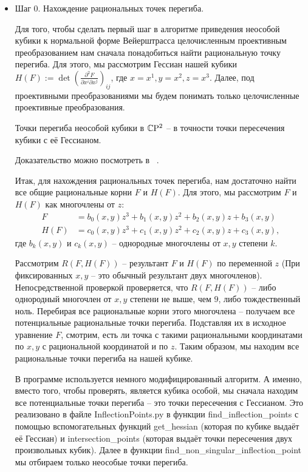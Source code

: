 \begin{itemize}[leftmargin=0.6cm]
    
    \item Шаг 0. Нахождение рациональных точек перегиба. 

    Для того, чтобы сделать первый шаг в алгоритме приведения неособой
    кубики к нормальной форме Вейерштрасса целочисленным проективным
    преобразованием нам сначала понадобиться найти рациональную точку
    перегиба. Для этого, мы рассмотрим Гессиан нашей кубики \(H(F) := \det \left(
    \frac{\partial^2 F}{\partial x^{i} \partial x^{j}}\right)_{ij}\), где \(x =
    x^{1}, y = x^{2}, z = x^{3}\). Далее, под проективными
    преобразованиями мы будем понимать только целочисленные проективные
    преобразования.

    \begin{theoremf}
        Точки перегиба неособой кубики в \(\mathbb{C} \mathrm{P}^2\) -- в точности
        точки пересечения кубики с её Гессианом.
    \end{theoremf}

    Доказательство можно посмотреть в ~\cite{pra_sol}.

    Итак, для нахождения рациональных точек перегиба, нам достаточно найти
    все общие рациональные корни \(F\) и \(H(F)\). Для этого, мы
    рассмотрим \(F\) и \(H(F)\) как многочлены от \(z\):
    \begin{align*}
        F &= b_0(x, y) z^3 + b_1(x, y) z^2 + b_2(x, y) z + b_3(x, y) \\
        H(F) &= c_0(x, y) z^3 + c_1(x, y) z^2 + c_2(x, y) z + c_3(x, y) 
    ,\end{align*}
    где \(b_k(x, y)\) и \(c_k(x, y)\) -- однородные многочлены от \(x, y\) 
    степени \(k\). 

    Рассмотрим \(R(F, H(F))\) -- результант \(F\) и \(H(F)\) по переменной
    \(z\) (При фиксированных \(x, y\) -- это обычный результант двух
    многочленов).  Непосредственной проверкой проверяется, что \(R(F, H(F))\)
    -- либо однородный многочлен от \(x, y\) степени не выше, чем \(9\), либо
    тождественный ноль. Перебирая все рациональные корни этого многочлена --
    получаем все потенциальные рациональные точки перегиба. Подставляя их в
    исходное уравнение \(F\), смотрим, есть ли точка с такими рациональными
    координатами по \(x, y\) с рациональной координатой и по \(z\). Таким
    образом, мы находим все рациональные точки перегиба на нашей кубике. 
    
    В программе используется немного модифицированный алгоритм. А именно,
    вместо того, чтобы проверять, является кубика особой, мы сначала находим
    все потенциальные точки перегиба -- это точки пересечения с Гессианом. Это
    реализовано в файле \textsf{InflectionPoints.py} в функции
    \textsf{find\_inflection\_points} с помощью вспомогательных функций
    \textsf{get\_hessian} (которая по кубике выдаёт её Гессиан) и
    \textsf{intersection\_points} (которая выдаёт точки пересечения двух
    произвольных кубик). Далее в функции
    \textsf{find\_non\_singular\_inflection\_point} мы отбираем только
    неособые точки перегиба.


\end{itemize}
